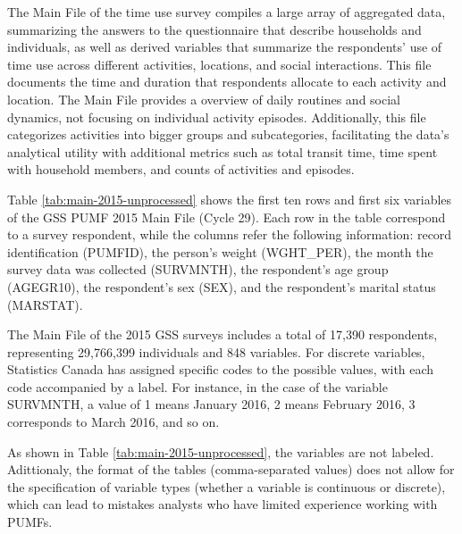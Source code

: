 \documentclass[Royal,times,sageh]{sagej}
\begin{document}
The Main File of the time use survey compiles a large array of
aggregated data, summarizing the answers to the questionnaire that
describe households and individuals, as well as derived variables that
summarize the respondents' use of time use across different activities,
locations, and social interactions. This file documents the time and
duration that respondents allocate to each activity and location. The
Main File provides a overview of daily routines and social dynamics, not
focusing on individual activity episodes. Additionally, this file
categorizes activities into bigger groups and subcategories,
facilitating the data's analytical utility with additional metrics such
as total transit time, time spent with household members, and counts of
activities and episodes.

Table \ref{tab:main-2015-unprocessed} shows the first ten rows and first
six variables of the GSS PUMF 2015 Main File (Cycle 29). Each row in the
table correspond to a survey respondent, while the columns refer the
following information: record identification (PUMFID), the person's
weight (WGHT\_PER), the month the survey data was collected (SURVMNTH),
the respondent's age group (AGEGR10), the respondent's sex (SEX), and
the respondent's marital status (MARSTAT).

The Main File of the 2015 GSS surveys includes a total of 17,390
respondents, representing 29,766,399 individuals and 848 variables. For
discrete variables, Statistics Canada has assigned specific codes to the
possible values, with each code accompanied by a label. For instance, in
the case of the variable SURVMNTH, a value of 1 means January 2016, 2
means February 2016, 3 corresponds to March 2016, and so on.

As shown in Table \ref{tab:main-2015-unprocessed}, the variables are not
labeled. Adittionaly, the format of the tables (comma-separated values)
does not allow for the specification of variable types (whether a
variable is continuous or discrete), which can lead to mistakes analysts
who have limited experience working with PUMFs.

\begingroup\fontsize{8}{10}\selectfont
\end{document}
